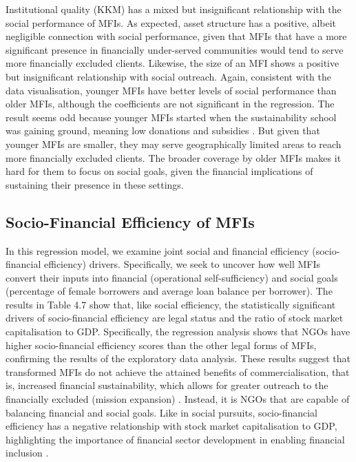 \documentclass[a4paper, nobind]{templates/ociamthesis}
\begin{document}
Institutional quality (KKM) has a mixed but insignificant relationship with the social performance of MFIs. As expected, asset structure has a positive, albeit negligible connection with social performance, given that MFIs that have a more significant presence in financially under-served communities would tend to serve more financially excluded clients. Likewise, the size of an MFI shows a positive but insignificant relationship with social outreach. Again, consistent with the data visualisation, younger MFIs have better levels of social performance than older MFIs, although the coefficients are not significant in the regression. The result seems odd because younger MFIs started when the sustainability school was gaining ground, meaning low donations and subsidies \autocite{d2013unsubsidized}. But given that younger MFIs are smaller, they may serve geographically limited areas to reach more financially excluded clients. The broader coverage by older MFIs makes it hard for them to focus on social goals, given the financial implications of sustaining their presence in these settings.

\hypertarget{socio-financial-efficiency-of-mfis}{%
\subsection{Socio-Financial Efficiency of MFIs}\label{socio-financial-efficiency-of-mfis}}

In this regression model, we examine joint social and financial efficiency (socio-financial efficiency) drivers. Specifically, we seek to uncover how well MFIs convert their inputs into financial (operational self-sufficiency) and social goals (percentage of female borrowers and average loan balance per borrower). The results in Table 4.7 show that, like social efficiency, the statistically significant drivers of socio-financial efficiency are legal status and the ratio of stock market capitalisation to GDP. Specifically, the regression analysis shows that NGOs have higher socio-financial efficiency scores than the other legal forms of MFIs, confirming the results of the exploratory data analysis. These results suggest that transformed MFIs do not achieve the attained benefits of commercialisation, that is, increased financial sustainability, which allows for greater outreach to the financially excluded (mission expansion) \autocite{mersland2010microfinance}. Instead, it is NGOs that are capable of balancing financial and social goals. Like in social pursuits, socio-financial efficiency has a negative relationship with stock market capitalisation to GDP, highlighting the importance of financial sector development in enabling financial inclusion \autocite{allen2013resolving}.
\end{document}
